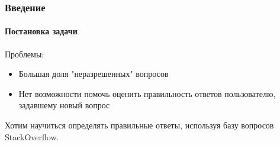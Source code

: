 \documentclass[10pt]{beamer}
\begin{document}
\begin{frame}
\frametitle{Введение}
\framesubtitle{Постановка задачи}

Проблемы:
\begin{itemize}
	\item Большая доля "неразрешенных" вопросов
	\item Нет возможности помочь оценить правильность ответов пользователю, задавшему новый вопрос
\end{itemize}

\vskip0.5cm

Хотим научиться определять правильные ответы, используя базу вопросов StackOverflow.

\end{frame}

\end{document}
